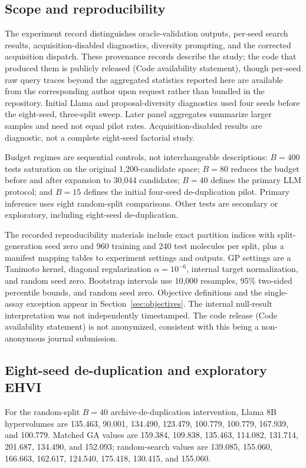\subsection{Scope and reproducibility}
The experiment record distinguishes oracle-validation outputs, per-seed search results, acquisition-disabled diagnostics, diversity prompting, and the corrected acquisition dispatch. These provenance records describe the study; the code that produced them is publicly released (Code availability statement), though per-seed raw query traces beyond the aggregated statistics reported here are available from the corresponding author upon request rather than bundled in the repository. Initial Llama and proposal-diversity diagnostics used four seeds before the eight-seed, three-split sweep. Later panel aggregates summarize larger samples and need not equal pilot rates. Acquisition-disabled results are diagnostic, not a complete eight-seed factorial study.

Budget regimes are sequential controls, not interchangeable descriptions: $B=400$ tests saturation on the original 1,200-candidate space; $B=80$ reduces the budget before and after expansion to 30,044 candidates; $B=40$ defines the primary LLM protocol; and $B=15$ defines the initial four-seed de-duplication pilot. Primary inference uses eight random-split comparisons. Other tests are secondary or exploratory, including eight-seed de-duplication.

The recorded reproducibility materials include exact partition indices with split-generation seed zero and 960 training and 240 test molecules per split, plus a manifest mapping tables to experiment settings and outputs. GP settings are a Tanimoto kernel, diagonal regularization $\alpha=10^{-6}$, internal target normalization, and random seed zero. Bootstrap intervals use 10,000 resamples, 95\% two-sided percentile bounds, and random seed zero. Objective definitions and the single-assay exception appear in Section~\ref{sec:objectives}. The internal null-result interpretation was not independently timestamped. The code release (Code availability statement) is not anonymized, consistent with this being a non-anonymous journal submission.

\subsection{Eight-seed de-duplication and exploratory EHVI}
\label{app:dedup-full8}
For the random-split $B=40$ archive-de-duplication intervention, Llama 8B hypervolumes are 135.463, 90.001, 134.490, 123.479, 100.779, 100.779, 167.939, and 100.779. Matched GA values are 159.384, 109.838, 135.463, 114.082, 131.714, 201.687, 134.490, and 152.093; random-search values are 139.085, 155.060, 166.663, 162.617, 124.540, 175.418, 130.415, and 155.060.

